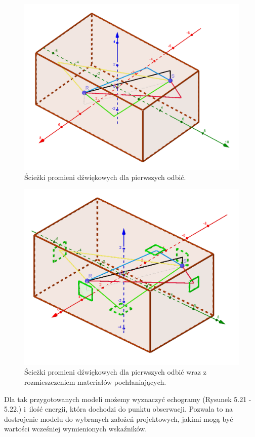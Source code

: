 \begin{figure}[h]
        \centering
                \centering
                \includegraphics[width=12cm]{1szeodbicia}
	\caption{Ścieżki promieni dźwiękowych dla pierwszych odbić.}
\end{figure}

\begin{figure}[h]
        \centering
                \centering
                \includegraphics[width=12cm]{1odbiciazpoch}
	\caption{Ścieżki promieni dźwiękowych dla pierwszych odbić wraz z rozmieszczeniem materiałów pochłaniających.}
\end{figure}

Dla tak przygotowanych modeli możemy wyznaczyć echogramy (Rysunek 5.21 - 5.22.) i~ilość energii, która dochodzi do punktu obserwacji. Pozwala to na dostrojenie modelu do wybranych założeń projektowych, jakimi mogą być wartości wcześniej wymienionych wskaźników.

